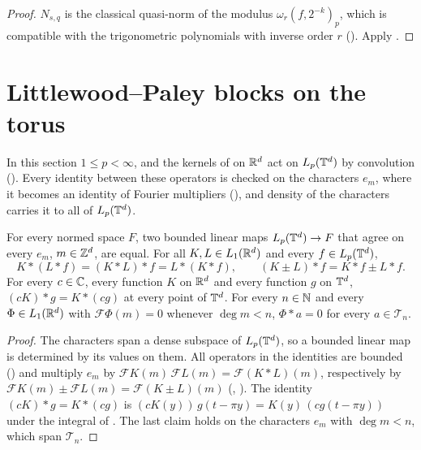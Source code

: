 \begin{proof}
\leanok
$N_{s, q}$ is the classical quasi-norm of the modulus $\omega_r(f, 2^{-k})_p$, which is
compatible with the trigonometric polynomials with inverse order $r$
(). Apply .
\end{proof}

\section{Littlewood--Paley blocks on the torus}
\label{sec:torus-lp-blocks}

In this section $1 \leq p < \infty$, and the kernels of  on $\mathbb{R}^d$ act on
$L_p(\mathbb{T}^d)$ by convolution (). Every identity between these operators is
checked on the characters $e_m$, where it becomes an identity of Fourier multipliers
(), and density of the characters carries it to all of
$L_p(\mathbb{T}^d)$.

\begin{lemma}
\label{lem:torus-econv-identities}
\leanok
{}
For every normed space $F$, two bounded linear maps $L_p(\mathbb{T}^d) \to F$ that agree on every $e_m$,
$m \in \mathbb{Z}^d$, are equal. For all
$K, L \in L_1(\mathbb{R}^d)$ and every $f \in L_p(\mathbb{T}^d)$,
\[
  K * (L * f) = (K * L) * f = L * (K * f), \qquad (K \pm L) * f = K * f \pm L * f .
\]
For every $c \in \mathbb{C}$, every function $K$ on $\mathbb{R}^d$ and every function $g$ on $\mathbb{T}^d$,
$(c K) * g = K * (c g)$ at every point of $\mathbb{T}^d$. For every $n \in \mathbb{N}$ and every
$\Phi \in L_1(\mathbb{R}^d)$ with $\mathcal{F}\Phi(m) = 0$ whenever $\deg m < n$, $\Phi * a = 0$ for
every $a \in \mathcal{T}_n$.
\end{lemma}

\begin{proof}
\leanok
The characters span a dense subspace of $L_p(\mathbb{T}^d)$, so a bounded linear map is determined by
its values on them. All operators in the identities are bounded () and
multiply $e_m$ by $\mathcal{F}K(m) \, \mathcal{F}L(m) = \mathcal{F}(K * L)(m)$, respectively by
$\mathcal{F}K(m) \pm \mathcal{F}L(m) = \mathcal{F}(K \pm L)(m)$ (,
). The identity $(c K) * g = K * (c g)$ is
$(c K(y)) \, g(t - \pi y) = K(y) \, (c g(t - \pi y))$ under the integral of
. The last claim holds on the characters $e_m$ with
$\deg m < n$, which span $\mathcal{T}_n$.
\end{proof}

